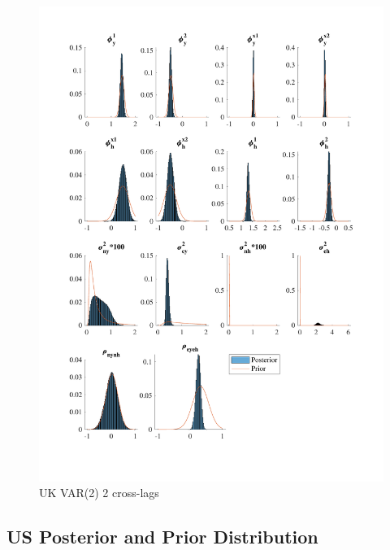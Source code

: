 \documentclass[
  12pt,
]{article}
\begin{document}
\begin{figure}

{\centering \includegraphics[width=0.85\linewidth]{../../Regression/Bayesian_UC_VAR2_drift_Crosscycle2lags/OutputData/posteriorpriordistribution_UK} 

}

\caption{UK VAR(2) 2 cross-lags}\label{fig:unnamed-chunk-11}
\end{figure}

\clearpage

\hypertarget{us-posterior-and-prior-distribution}{%
\subsection{US Posterior and Prior Distribution}\label{us-posterior-and-prior-distribution}}
\end{document}
